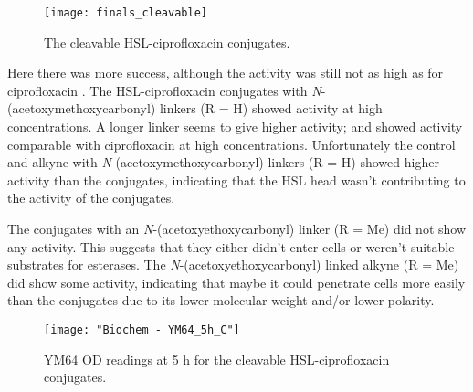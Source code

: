 \begin{figure}[H]
	\begin{center}
		\texttt{[image: finals\_cleavable]}
		\caption{The cleavable HSL-ciprofloxacin conjugates.
 		\label{fgr:finals_cleavable}}
	\end{center}
\end{figure}

Here there was more success, although the activity was still not as high as for ciprofloxacin .
The HSL-ciprofloxacin conjugates with \textit{N}-(acetoxymethoxycarbonyl) linkers (R = H) showed activity at high concentrations. A longer linker seems to give higher activity;  and  showed activity comparable with ciprofloxacin  at high concentrations.
Unfortunately the control  and alkyne  with \textit{N}-(acetoxymethoxycarbonyl) linkers (R = H) showed higher activity than the conjugates, indicating that the HSL head wasn't contributing to the activity of the conjugates.

The conjugates with an \textit{N}-(acetoxyethoxycarbonyl) linker (R = Me) did not show any activity. This suggests that they either didn't enter cells or weren't suitable substrates for esterases.
The \textit{N}-(acetoxyethoxycarbonyl) linked alkyne (R = Me) did show some activity, indicating that maybe it could penetrate cells more easily than the conjugates due to its lower molecular weight and/or lower polarity.

\begin{figure}[H]
	\begin{center}
		\texttt{[image: "Biochem - YM64\_5h\_C"]}
		\caption{YM64 OD readings at 5 h for the cleavable HSL-ciprofloxacin conjugates.\label{fgr:YM64_5h_cleavable}}
	\end{center}
\end{figure}
